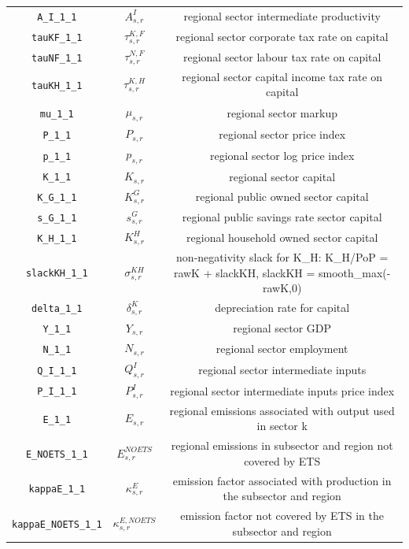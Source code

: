 \begin{center}
\begin{longtable}{ccc}
\texttt{A\_I\_1\_1} & ${A^{I}_{s,r}}$ & regional sector intermediate productivity\\
\texttt{tauKF\_1\_1} & ${\tau^{K,F}_{s,r}}$ & regional sector corporate tax rate on capital\\
\texttt{tauNF\_1\_1} & ${\tau^{N,F}_{s,r}}$ & regional sector labour tax rate on capital\\
\texttt{tauKH\_1\_1} & ${\tau^{K,H}_{s,r}}$ & regional sector capital income tax rate on capital\\
\texttt{mu\_1\_1} & ${\mu_{s,r}}$ & regional sector markup\\
\texttt{P\_1\_1} & ${P_{s,r}}$ & regional sector price index\\
\texttt{p\_1\_1} & ${p_{s,r}}$ & regional sector log price index\\
\texttt{K\_1\_1} & ${K_{s,r}}$ & regional sector capital\\
\texttt{K\_G\_1\_1} & ${K^G_{s,r}}$ & regional public owned sector capital\\
\texttt{s\_G\_1\_1} & ${s^G_{s,r}}$ & regional public savings rate sector capital\\
\texttt{K\_H\_1\_1} & ${K^H_{s,r}}$ & regional household owned sector capital\\
\texttt{slackKH\_1\_1} & ${\sigma^{KH}_{s,r}}$ & non-negativity slack for K\_H: K\_H/PoP = rawK + slackKH, slackKH = smooth\_max(-rawK,0)\\
\texttt{delta\_1\_1} & ${\delta^{K}_{s,r}}$ & depreciation rate for capital\\
\texttt{Y\_1\_1} & ${Y_{s,r}}$ & regional sector GDP\\
\texttt{N\_1\_1} & ${N_{s,r}}$ & regional sector employment\\
\texttt{Q\_I\_1\_1} & ${Q^{I}_{s,r}}$ & regional sector intermediate inputs\\
\texttt{P\_I\_1\_1} & ${P^{I}_{s,r}}$ & regional sector intermediate inputs price index\\
\texttt{E\_1\_1} & ${E_{s,r}}$ & regional emissions associated with output used in sector k\\
\texttt{E\_NOETS\_1\_1} & ${E^{NOETS}_{s,r}}$ & regional emissions in subsector and region not covered by ETS\\
\texttt{kappaE\_1\_1} & ${\kappa^{E}_{s,r}}$ & emission factor associated with production in the subsector and region\\
\texttt{kappaE\_NOETS\_1\_1} & ${\kappa^{E,NOETS}_{s,r}}$ & emission factor not covered by ETS in the subsector and region\\

\end{longtable}
\end{center}
